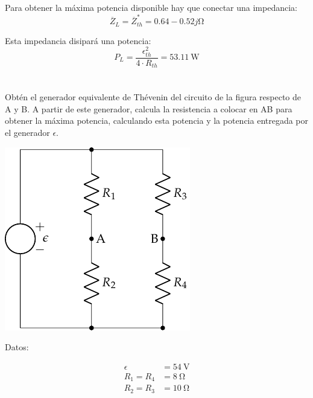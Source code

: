 \documentclass[12pt]{article}
\begin{document}
Para obtener la máxima potencia disponible hay que conectar una impedancia:
\begin{equation*}
\overline{Z}_L = \overline{Z}^*_{th} = 0.64-0.52j\si{\ohm}
\end{equation*}

Esta impedancia disipará una potencia:
\begin{equation*}
P_L = \frac{\epsilon_{th}^2}{4 \cdot R_{th}} = \SI{53.11}{\watt}
\end{equation*}

\clearpage

\section{}

Obtén el generador equivalente de Thévenin del circuito de la figura respecto de A y B. A partir de este generador, calcula la resistencia a colocar en AB para obtener la máxima potencia, calculando esta potencia y la potencia entregada por el generador $\epsilon$.

\begin{center}
\includegraphics{figs/Thevenin2}
\end{center}

Datos:

\begin{align*}
  \epsilon &= \SI{54}{\volt}\\
  R_1 = R_4 &= \SI{8}{\ohm}\\
  R_2 = R_3 &= \SI{10}{\ohm}
\end{align*}

\noindent\hrulefill

\clearpage

\section{}
\end{document}

